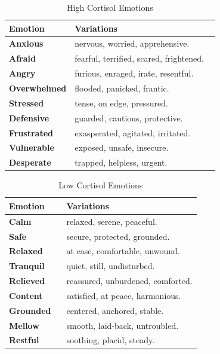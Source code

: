 \begin{table}[H]
\centering
\caption{High Cortisol Emotions}
\begin{tabular}{@{}l p{0.7\linewidth}@{}}
\hline
\textbf{Emotion} & \textbf{Variations} \\
\hline
\textbf{Anxious} & nervous, worried, apprehensive. \\
\textbf{Afraid} & fearful, terrified, scared, frightened. \\
\textbf{Angry} & furious, enraged, irate, resentful. \\
\textbf{Overwhelmed} & flooded, panicked, frantic. \\
\textbf{Stressed} & tense, on edge, pressured. \\
\textbf{Defensive} & guarded, cautious, protective. \\
\textbf{Frustrated} & exasperated, agitated, irritated. \\
\textbf{Vulnerable} & exposed, unsafe, insecure. \\
\textbf{Desperate} & trapped, helpless, urgent. \\
\hline
\end{tabular}
\label{tab:cortisol-emotions}
\end{table}

\begin{table}[H]
\centering
\caption{Low Cortisol Emotions}
\begin{tabular}{@{}l p{0.7\linewidth}@{}}
\hline
\textbf{Emotion} & \textbf{Variations} \\
\hline
\textbf{Calm} & relaxed, serene, peaceful. \\
\textbf{Safe} & secure, protected, grounded. \\
\textbf{Relaxed} & at ease, comfortable, unwound. \\
\textbf{Tranquil} & quiet, still, undisturbed. \\
\textbf{Relieved} & reassured, unburdened, comforted. \\
\textbf{Content} & satisfied, at peace, harmonious. \\
\textbf{Grounded} & centered, anchored, stable. \\
\textbf{Mellow} & smooth, laid-back, untroubled. \\
\textbf{Restful} & soothing, placid, steady. \\
\hline
\end{tabular}
\label{tab:cortisol-emotions-low}
\end{table}

